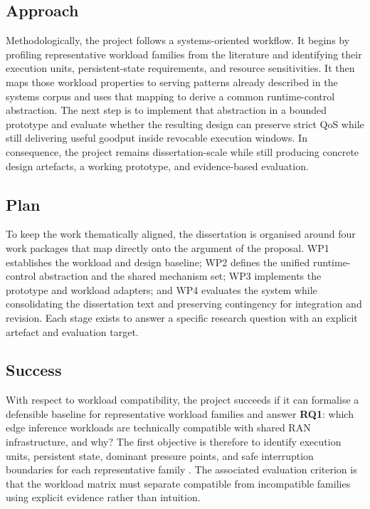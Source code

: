 \documentclass[a4paper,11pt]{article}
\begin{document}
\subsection{Approach}

Methodologically, the project follows a systems-oriented workflow. It begins by profiling representative workload families from the literature and identifying their execution units, persistent-state requirements, and resource sensitivities. It then maps those workload properties to serving patterns already described in the systems corpus and uses that mapping to derive a common runtime-control abstraction. The next step is to implement that abstraction in a bounded prototype and evaluate whether the resulting design can preserve strict QoS while still delivering useful goodput inside revocable execution windows. In consequence, the project remains dissertation-scale while still producing concrete design artefacts, a working prototype, and evidence-based evaluation.

\subsection{Plan}

To keep the work thematically aligned, the dissertation is organised around four work packages that map directly onto the argument of the proposal. WP1 establishes the workload and design baseline; WP2 defines the unified runtime-control abstraction and the shared mechanism set; WP3 implements the prototype and workload adapters; and WP4 evaluates the system while consolidating the dissertation text and preserving contingency for integration and revision. Each stage exists to answer a specific research question with an explicit artefact and evaluation target.

\subsection{Success}

With respect to workload compatibility, the project succeeds if it can formalise a defensible baseline for representative workload families and answer \textbf{RQ1}: which edge inference workloads are technically compatible with shared RAN infrastructure, and why? The first objective is therefore to identify execution units, persistent state, dominant pressure points, and safe interruption boundaries for each representative family \cite{cora,slaairan}. The associated evaluation criterion is that the workload matrix must separate compatible from incompatible families using explicit evidence rather than intuition.
\end{document}
